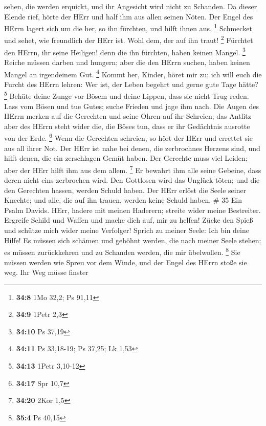 sehen, die werden erquickt, und ihr Angesicht wird nicht zu Schanden.
 Da dieser Elende rief, hörte der HErr und half ihm aus
allen seinen Nöten.  Der Engel des HErrn lagert sich um die
her, so ihn fürchten, und hilft ihnen aus. \footnote{\textbf{34:8} 1Mo
  32,2; Ps 91,11}  Schmecket und sehet, wie freundlich der
HErr ist. Wohl dem, der auf ihn traut! \footnote{\textbf{34:9} 1Petr 2,3}
 Fürchtet den HErrn, ihr seine Heiligen! denn die ihn
fürchten, haben keinen Mangel. \footnote{\textbf{34:10} Ps 37,19}
 Reiche müssen darben und hungern; aber die den HErrn
suchen, haben keinen Mangel an irgendeinem Gut. \footnote{\textbf{34:11}
  Ps 33,18-19; Ps 37,25; Lk 1,53}  Kommt her, Kinder, höret
mir zu; ich will euch die Furcht des HErrn lehren:  Wer
ist, der Leben begehrt und gerne gute Tage hätte? \footnote{\textbf{34:13}
  1Petr 3,10-12}  Behüte deine Zunge vor Bösem und deine
Lippen, dass sie nicht Trug reden.  Lass vom Bösen und tue
Gutes; suche Frieden und jage ihm nach.  Die Augen des
HErrn merken auf die Gerechten und seine Ohren auf ihr Schreien;
 das Antlitz aber des HErrn steht wider die, die Böses tun,
dass er ihr Gedächtnis ausrotte von der Erde. \footnote{\textbf{34:17}
  Spr 10,7}  Wenn die Gerechten schreien, so hört der HErr
und errettet sie aus all ihrer Not.  Der HErr ist nahe bei
denen, die zerbrochnes Herzens sind, und hilft denen, die ein
zerschlagen Gemüt haben.  Der Gerechte muss viel Leiden;
aber der HErr hilft ihm aus dem allem. \footnote{\textbf{34:20} 2Kor 1,5}
 Er bewahrt ihm alle seine Gebeine, dass deren nicht eins
zerbrochen wird.  Den Gottlosen wird das Unglück töten; und
die den Gerechten hassen, werden Schuld haben.  Der HErr
erlöst die Seele seiner Knechte; und alle, die auf ihn trauen, werden
keine Schuld haben. \# 35  Ein Psalm Davids. HErr, hadere
mit meinen Haderern; streite wider meine Bestreiter. 
Ergreife Schild und Waffen und mache dich auf, mir zu helfen!
 Zücke den Spieß und schütze mich wider meine Verfolger!
Sprich zu meiner Seele: Ich bin deine Hilfe!  Es müssen sich
schämen und gehöhnt werden, die nach meiner Seele stehen; es müssen
zurückkehren und zu Schanden werden, die mir übelwollen. \footnote{\textbf{35:4}
  Ps 40,15}  Sie müssen werden wie Spreu vor dem Winde, und
der Engel des HErrn stoße sie weg.  Ihr Weg müsse finster

